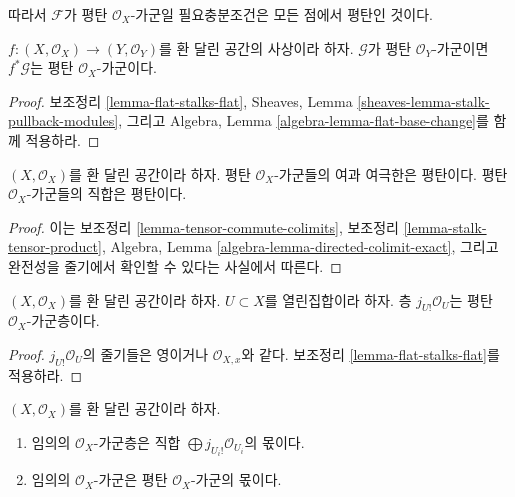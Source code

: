 \noindent
따라서 $\mathcal{F}$가 평탄 $\mathcal{O}_X$-가군일 필요충분조건은
모든 점에서 평탄인 것이다.

\begin{lemma}
\label{lemma-base-change-flat}
$f : (X, \mathcal{O}_X) \to (Y, \mathcal{O}_Y)$를
환 달린 공간의 사상이라 하자. $\mathcal{G}$가 평탄
$\mathcal{O}_Y$-가군이면 $f^*\mathcal{G}$는 평탄 $\mathcal{O}_X$-가군이다.
\end{lemma}

\begin{proof}
보조정리 \ref{lemma-flat-stalks-flat}, Sheaves, Lemma
\ref{sheaves-lemma-stalk-pullback-modules}, 그리고 Algebra, Lemma
\ref{algebra-lemma-flat-base-change}를 함께 적용하라.
\end{proof}

\begin{lemma}
\label{lemma-colimits-flat}
$(X, \mathcal{O}_X)$를 환 달린 공간이라 하자.
평탄 $\mathcal{O}_X$-가군들의 여과 여극한은 평탄이다.
평탄 $\mathcal{O}_X$-가군들의 직합은 평탄이다.
\end{lemma}

\begin{proof}
이는 보조정리 \ref{lemma-tensor-commute-colimits}, 보조정리
\ref{lemma-stalk-tensor-product}, Algebra, Lemma
\ref{algebra-lemma-directed-colimit-exact}, 그리고 완전성을 줄기에서
확인할 수 있다는 사실에서 따른다.
\end{proof}

\begin{lemma}
\label{lemma-j-shriek-flat}
$(X, \mathcal{O}_X)$를 환 달린 공간이라 하자.
$U \subset X$를 열린집합이라 하자. 층 $j_{U!}\mathcal{O}_U$는
평탄 $\mathcal{O}_X$-가군층이다.
\end{lemma}

\begin{proof}
$j_{U!}\mathcal{O}_U$의 줄기들은 영이거나 $\mathcal{O}_{X, x}$와 같다.
보조정리 \ref{lemma-flat-stalks-flat}를 적용하라.
\end{proof}

\begin{lemma}
\label{lemma-module-quotient-flat}
$(X, \mathcal{O}_X)$를 환 달린 공간이라 하자.
\begin{enumerate}
\item 임의의 $\mathcal{O}_X$-가군층은 직합
$\bigoplus j_{U_i!}\mathcal{O}_{U_i}$의 몫이다.
\item 임의의 $\mathcal{O}_X$-가군은 평탄 $\mathcal{O}_X$-가군의 몫이다.
\end{enumerate}
\end{lemma}

